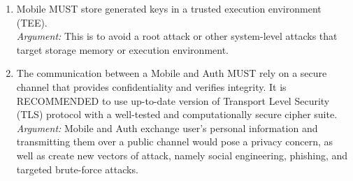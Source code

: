 \begin{enumerate}
            \item Mobile MUST store generated keys in a trusted execution environment (TEE).\\        
            \textit{Argument:} This is to avoid a root attack or other system-level attacks that target storage 
                            memory or execution environment.

            \item The communication between a Mobile and Auth MUST rely on a secure channel that provides 
                confidentiality and verifies integrity. It is RECOMMENDED to use up-to-date version of 
                Transport Level Security (TLS) protocol with a well-tested and computationally secure 
                cipher suite.\\      
            \textit{Argument:} Mobile and Auth exchange user's personal information and transmitting them over a 
                            public channel would pose a privacy concern, as well as create new vectors of attack, 
                            namely social engineering, phishing, and targeted brute-force attacks.
        \end{enumerate}